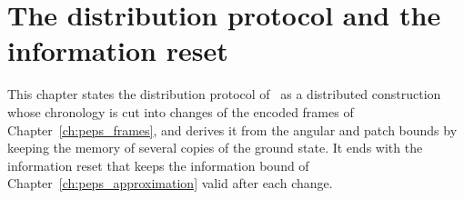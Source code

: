 \chapter{The distribution protocol and the information reset}
\label{ch:peps_frames_protocol}

This chapter states the distribution protocol
of~\cite[Proposition~7.1]{OpenAI2026PolynomialPEPS} as a distributed
construction whose chronology is cut into changes of the encoded frames of
Chapter~\ref{ch:peps_frames}, and derives it from the angular and patch bounds
by keeping the memory of several copies of the ground state. It ends with the
information reset that keeps the information bound of
Chapter~\ref{ch:peps_approximation} valid after each change.








